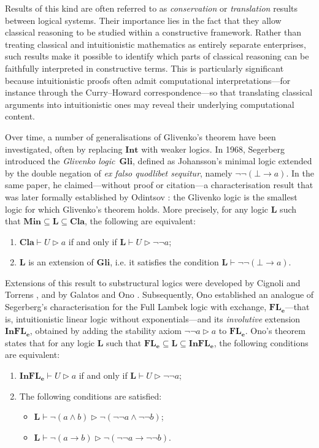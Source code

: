 \documentclass[runningheads]{llncs}
\newcommand{\FLe}{\mathbf{FL_e}}
\newcommand{\InFLe}{\mathbf{InFL_e}}
\newcommand{\Min}{\mathbf{Min}}
\newcommand{\Cl}{\mathbf{Cla}}
\newcommand{\Gl}{\mathbf{Gli}}
\newcommand{\Int}{\mathbf{Int}}
\begin{document}
Results of this kind are often referred to as \emph{conservation} or \emph{translation} results between logical systems. Their importance lies in the fact that they allow classical reasoning to be studied within a constructive framework. Rather than treating classical and intuitionistic mathematics as entirely separate enterprises, such results make it possible to identify which parts of classical reasoning can be faithfully interpreted in constructive terms. This is particularly significant because intuitionistic proofs often admit computational interpretations---for instance through the Curry--Howard correspondence---so that translating classical arguments into intuitionistic ones may reveal their underlying computational content.

Over time, a number of generalisations of Glivenko's theorem have been investigated, often by replacing $\Int$ with weaker logics. In 1968, Segerberg \cite{Segerberg1968-SEGPLR} introduced the \emph{Glivenko logic}~$\Gl$, defined as Johansson's minimal logic extended by the double negation of \emph{ex falso quodlibet sequitur}, namely $\neg\neg(\bot \to a)$. In the same paper, he claimed---without proof or citation---a characterisation result that was later formally established by Odintsov \cite{Odintsov02,Odintsov2004-ODINEO-2}: the Glivenko logic is the smallest logic for which Glivenko's theorem holds. More precisely, for any logic $\mathbf{L}$ such that $\Min \subseteq \mathbf{L} \subseteq \Cl$, the following are equivalent:
\begin{enumerate}
    \item $\Cl \vdash U \rhd a$ if and only if $\mathbf{L} \vdash U \rhd \neg\neg a$;
    \item $\mathbf{L}$ is an extension of $\Gl$, i.e. it satisfies the condition $\mathbf{L}\vdash\neg\neg(\bot \to a)$.
\end{enumerate}

Extensions of this result to substructural logics were developed by Cignoli and Torrens \cite{Cignoli2003-CIGHBF,CignoliTorrens}, and by Galatos and Ono \cite{GO:glitsl,ResLat}. Subsequently, Ono \cite{ono:gli} established an analogue of Segerberg's characterisation for the Full Lambek logic with exchange, $\FLe$---that is, intuitionistic linear logic without exponentials---and its \emph{involutive} extension $\InFLe$, obtained by adding the stability axiom $\neg\neg a \rhd a$ to $\FLe$. Ono's theorem states that for any logic $\mathbf{L}$ such that $\FLe \subseteq \mathbf{L} \subseteq \InFLe$, the following conditions are equivalent:
\begin{enumerate}
    \item $\InFLe \vdash U \rhd a$ if and only if $\mathbf{L} \vdash U \rhd \neg\neg a$;
    \item The following conditions are satisfied:
    \begin{itemize}
        \item $\mathbf{L} \vdash \neg(a \wedge b) \rhd \neg(\neg\neg a \wedge \neg\neg b)$;
        \item $\mathbf{L} \vdash \neg(a \to b) \rhd \neg(\neg\neg a \to \neg\neg b)$.
    \end{itemize}
\end{enumerate}
\end{document}
